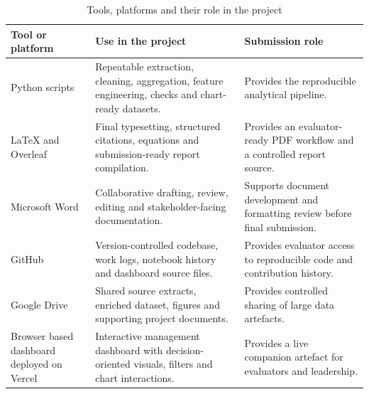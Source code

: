\documentclass[11pt,a4paper]{article}
\begin{document}
\begin{table}[h]
\centering
\caption{Tools, platforms and their role in the project}
\begin{tabularx}{\textwidth}{L{3.6cm} L{5.0cm} L{4.9cm}}
\toprule
\textbf{Tool or platform} & \textbf{Use in the project} & \textbf{Submission role} \\
\midrule
Python scripts & Repeatable extraction, cleaning, aggregation, feature engineering, checks and chart-ready datasets. & Provides the reproducible analytical pipeline. \\
LaTeX and Overleaf & Final typesetting, structured citations, equations and submission-ready report compilation. & Provides an evaluator-ready PDF workflow and a controlled report source. \\
Microsoft Word & Collaborative drafting, review, editing and stakeholder-facing documentation. & Supports document development and formatting review before final submission. \\
GitHub & Version-controlled codebase, work logs, notebook history and dashboard source files. & Provides evaluator access to reproducible code and contribution history. \\
Google Drive & Shared source extracts, enriched dataset, figures and supporting project documents. & Provides controlled sharing of large data artefacts. \\
Browser based dashboard deployed on Vercel & Interactive management dashboard with decision-oriented visuals, filters and chart interactions. & Provides a live companion artefact for evaluators and leadership. \\
\bottomrule
\end{tabularx}
\end{table}
\end{document}
